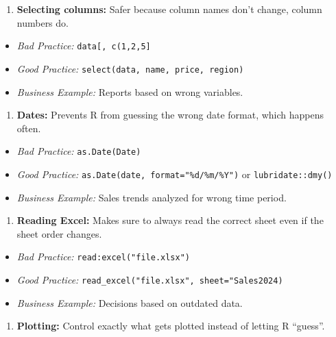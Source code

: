 \documentclass[
  stu,
  floatsintext,
  longtable,
  a4paper,
  nolmodern,
  notxfonts,
  notimes,
  colorlinks=true,linkcolor=blue,citecolor=blue,urlcolor=blue]{apa7}
\providecommand{\tightlist}{%
  \setlength{\itemsep}{0pt}\setlength{\parskip}{0pt}}
\begin{document}
\begin{enumerate}
\def\labelenumi{\arabic{enumi}.}
\setcounter{enumi}{8}
\tightlist
\item
  \textbf{Selecting columns:} Safer because column names don't change,
  column numbers do.
\end{enumerate}

\begin{itemize}
\tightlist
\item
  \emph{Bad Practice:} \texttt{data{[},\ c(1,2,5{]}}
\item
  \emph{Good Practice:} \texttt{select(data,\ name,\ price,\ region)}
\item
  \emph{Business Example:} Reports based on wrong variables.
\end{itemize}

\begin{enumerate}
\def\labelenumi{\arabic{enumi}.}
\setcounter{enumi}{9}
\tightlist
\item
  \textbf{Dates:} Prevents R from guessing the wrong date format, which
  happens often.
\end{enumerate}

\begin{itemize}
\tightlist
\item
  \emph{Bad Practice:} \texttt{as.Date(Date)}
\item
  \emph{Good Practice:} \texttt{as.Date(date,\ format="\%d/\%m/\%Y")} or
  \texttt{lubridate::dmy()}
\item
  \emph{Business Example:} Sales trends analyzed for wrong time period.
\end{itemize}

\begin{enumerate}
\def\labelenumi{\arabic{enumi}.}
\setcounter{enumi}{10}
\tightlist
\item
  \textbf{Reading Excel:} Makes sure to always read the correct sheet
  even if the sheet order changes.
\end{enumerate}

\begin{itemize}
\tightlist
\item
  \emph{Bad Practice:} \texttt{read:excel("file.xlsx")}
\item
  \emph{Good Practice:}
  \texttt{read\_excel("file.xlsx",\ sheet="Sales2024)}
\item
  \emph{Business Example:} Decisions based on outdated data.
\end{itemize}

\begin{enumerate}
\def\labelenumi{\arabic{enumi}.}
\setcounter{enumi}{11}
\tightlist
\item
  \textbf{Plotting:} Control exactly what gets plotted instead of
  letting R ``guess''.
\end{enumerate}
\end{document}
